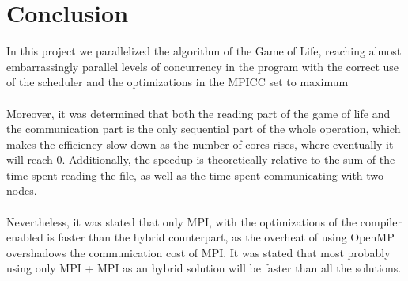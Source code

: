 \documentclass[11pt, a4paper]{article}
\begin{document}
	\section{Conclusion}
	In this project we parallelized the algorithm of the Game of Life, reaching almost embarrassingly parallel levels of concurrency in the program with the correct use of the scheduler and the optimizations in the MPICC set to maximum\\
\\
Moreover, it was determined that both the reading part of the game of life and the communication part is the only sequential part of the whole operation, which makes the efficiency slow down as the number of cores rises, where eventually it will reach 0. Additionally, the speedup is theoretically relative to the sum of the time spent reading the file, as well as the time spent communicating with two nodes.\\
\\
Nevertheless, it was stated that only MPI, with the optimizations of the compiler enabled is faster than the hybrid counterpart, as the overheat of using OpenMP overshadows the communication cost of MPI. It was stated that most probably using only MPI + MPI as an hybrid solution will be faster than all the solutions.
	
	
	
\end{document}
